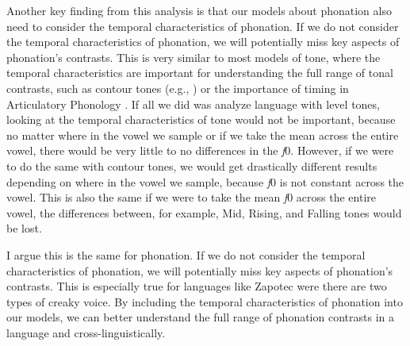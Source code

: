 Another key finding from this analysis is that our models about phonation also need to consider the temporal characteristics of phonation. If we do not consider the temporal characteristics of phonation, we will potentially miss key aspects of phonation's contrasts. This is very similar to most models of tone, where the temporal characteristics are important for understanding the full range of tonal contrasts, such as contour tones (e.g., \cite{yipTone2002}) or the importance of timing in Articulatory Phonology \citep{browmanNotesSyllableStructure1988,browmanArticulatoryGesturesPhonological1989,browmanArticulatoryPhonologyOverview1992}. If all we did was analyze language with level tones, looking at the temporal characteristics of tone would not be important, because no matter where in the vowel we sample or if we take the mean across the entire vowel, there would be very little to no differences in the \textit{f}0. However, if we were to do the same with contour tones, we would get drastically different results depending on where in the vowel we sample, because \textit{f}0 is not constant across the vowel. This is also the same if we were to take the mean \textit{f}0 across the entire vowel, the differences between, for example, Mid, Rising, and Falling tones would be lost. 

I argue this is the same for phonation. If we do not consider the temporal characteristics of phonation, we will potentially miss key aspects of phonation's contrasts. This is especially true for languages like Zapotec were there are two types of creaky voice. By including the temporal characteristics of phonation into our models, we can better understand the full range of phonation contrasts in a language and cross-linguistically.